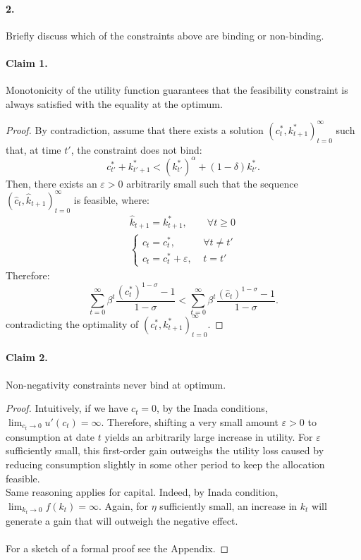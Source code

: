 \documentclass[dvipsnames,11pt]{article}
\begin{document}
\paragraph{2.} Briefly discuss which of the constraints above are binding or non-binding.

\begin{solution}
\paragraph{Claim 1.} Monotonicity of the utility function guarantees that the feasibility constraint is always satisfied with the equality at the optimum.
\begin{proof}
    
By contradiction, assume that there exists a solution $(c_t^*,k_{t+1}^*)_{t=0}^{\infty}$ such that, at time $t'$, the constraint does not bind:
\begin{equation*}
    c_{t'}^*+k_{t'+1}^*<(k_{t'}^*)^\alpha+(1-\delta)k_{t'}^*.
\end{equation*}
Then, there exists an $\varepsilon>0$ arbitrarily small such that the sequence $(\hat c_t,\hat k_{t+1})_{t=0}^\infty$ is feasible, where:
\begin{align*}
    \hat k_{t+1}=k_{t+1}^*, \qquad \forall t \geq 0 \\
    \begin{cases}
        \hat c_t=c_t^*, \qquad &\forall t \neq t' \\
        \hat c_t=c_t^*+\varepsilon, &t=t'
    \end{cases}
\end{align*}
Therefore:
\begin{equation*}
    \sum_{t=0}^\infty \beta^t \frac{(c_t^*)^{1-\sigma}-1}{1-\sigma} < \sum_{t=0}^\infty \beta^t\frac{(\hat c_t)^{1-\sigma}-1}{1-\sigma}.
\end{equation*}
contradicting the optimality of $(c_t^*,k_{t+1}^*)_{t=0}^{\infty}$. 
\end{proof}

\paragraph{Claim 2.} Non-negativity constraints never bind at optimum.

\begin{proof}
Intuitively, if we have $c_t=0$, by the Inada conditions, $\lim_{c_t \to 0} u'(c_t)= \infty$. Therefore, shifting a very small amount 
$\varepsilon>0$ to consumption at date 
$t$ yields an arbitrarily large increase in utility. For 
$\varepsilon$ sufficiently small, this first-order gain outweighs the utility loss caused by reducing consumption slightly in some other period to keep the allocation feasible. \\
Same reasoning applies for capital. Indeed, by Inada condition, $\lim_{k_t \to 0}f(k_t)=\infty$. Again, for $\eta$ sufficiently small, an increase in $k_t$ will generate a gain that will outweigh the negative effect. \\
\\
For a sketch of a formal proof see the Appendix.\end{proof}


\end{solution}
\end{document}
